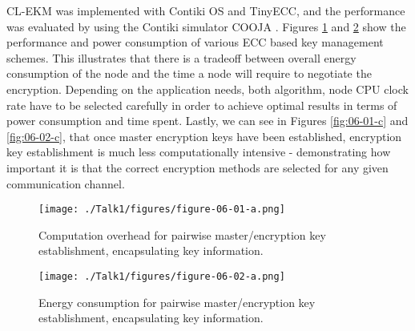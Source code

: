 \documentclass[12pt,a4paper,twoside]{report}
\begin{document}
CL-EKM was implemented with Contiki OS and TinyECC, and the performance was evaluated by using the Contiki simulator COOJA \cite{seo;etal:2015}. Figures \ref{fig:06-01-a} and \ref{fig:06-02-a} show the performance and power consumption of various ECC based key management schemes. This illustrates that there is a tradeoff between overall energy consumption of the node and the time a node will require to negotiate the encryption. Depending on the application needs, both algorithm, node CPU clock rate have to be selected carefully in order to achieve optimal results in terms of power consumption and time spent. Lastly, we can see in Figures \ref{fig:06-01-c} and \ref{fig:06-02-c}, that once master encryption keys have been established, encryption key establishment is much less computationally intensive - demonstrating how important it is that the correct encryption methods are selected for any given communication channel. \par
\begin{figure}[ht]
	\begin{center}
  \texttt{[image: ./Talk1/figures/figure-06-01-a.png]}
  \end{center}
  \caption{Computation overhead for pairwise master/encryption key establishment, encapsulating key information. \cite{seo;etal:2015}}
  \label{fig:06-01-a}
\end{figure}
\begin{figure}[ht]
	\begin{center}
  \texttt{[image: ./Talk1/figures/figure-06-02-a.png]}
  \end{center}
  \caption{Energy consumption for pairwise master/encryption key establishment, encapsulating key information. \cite{seo;etal:2015}}
  \label{fig:06-02-a}
\end{figure}
\end{document}
